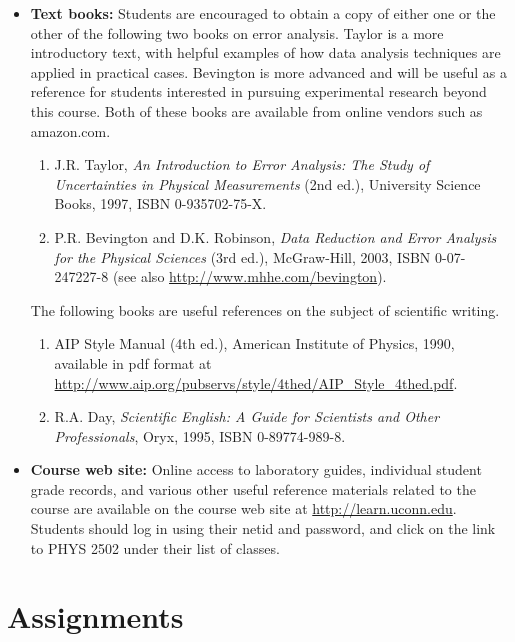 \documentclass{revtex4}
\begin{document}
\begin{itemize}
\item
{\bf Text books:} Students are encouraged to obtain a copy of either one or
the other of the following two books on error analysis. Taylor is a more
introductory text, with helpful examples of how data analysis techniques
are applied in practical cases. Bevington is more advanced and will be useful
as a reference for students interested in pursuing experimental research
beyond this course. Both of these books are available from online vendors
such as amazon.com.
\begin{enumerate}
\item
J.R. Taylor, {\it An Introduction to Error Analysis: The Study of Uncertainties
in Physical Measurements} (2nd ed.), University Science Books, 1997, 
ISBN 0-935702-75-X.
\item
P.R. Bevington and D.K. Robinson, {\it Data Reduction and Error Analysis for
the Physical Sciences} (3rd ed.), McGraw-Hill, 2003, ISBN 0-07-247227-8 
(see also \url{http://www.mhhe.com/bevington}).
\end{enumerate}
The following books are useful references on the subject of scientific writing.
\begin{enumerate}
\item
{AIP Style Manual} (4th ed.), American Institute of Physics, 1990, available
in pdf format at \url{http://www.aip.org/pubservs/style/4thed/AIP_Style_4thed.pdf}.
\item
R.A. Day, {\it Scientific English: A Guide for Scientists and Other 
Professionals}, Oryx, 1995, ISBN 0-89774-989-8.
\end{enumerate}
\item
{\bf Course web site:} Online access to laboratory guides, individual student
grade records, and various other useful reference materials related to the
course are available on the course web site at \url{http://learn.uconn.edu}.
Students should log in using their netid and password, and click on the link
to PHYS 2502 under their list of classes.
\end{itemize}

\section{Assignments}
\end{document}
